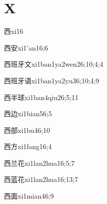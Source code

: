 \section*{X}

\begin{verbete}{西}{xi1}{6}
\end{verbete}

\begin{verbete}{西安}{xi1'an1}{6;6}
\end{verbete}

\begin{verbete}{西班牙文}{xi1ban1ya2wen2}{6;10;4;4}
\end{verbete}

\begin{verbete}{西班牙语}{xi1ban1ya2yu3}{6;10;4;9}
\end{verbete}

\begin{verbete}{西半球}{xi1ban4qiu2}{6;5;11}
\end{verbete}

\begin{verbete}{西边}{xi1bian5}{6;5}
\end{verbete}

\begin{verbete}{西部}{xi1bu4}{6;10}
\end{verbete}

\begin{verbete}{西方}{xi1fang1}{6;4}
\end{verbete}

\begin{verbete}{西兰花}{xi1lan2hua1}{6;5;7}
\end{verbete}

\begin{verbete}{西蓝花}{xi1lan2hua1}{6;13;7}
\end{verbete}

\begin{verbete}{西面}{xi1mian4}{6;9}
\end{verbete}

